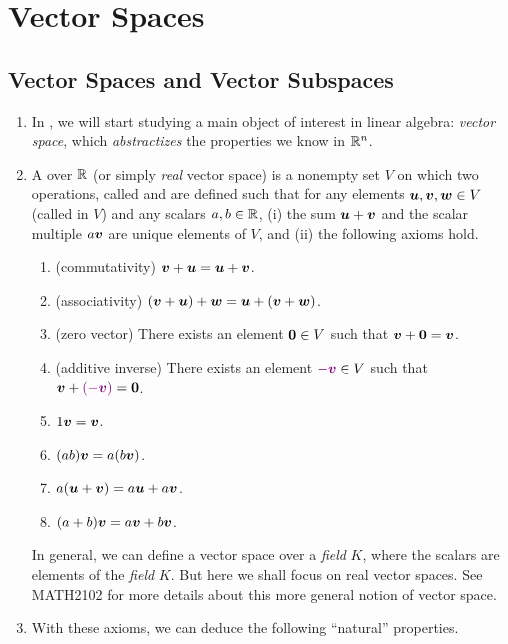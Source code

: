 \section{Vector Spaces}
\label{sect:vector-spaces}
\subsection{Vector Spaces and Vector Subspaces}
\begin{enumerate}
\item In , we will start studying a main object of
interest in linear algebra: \emph{vector space}, which \emph{abstractizes} the
properties we know in \(\mathbb{R}^n\).
\item A  over \(\mathbb{R}\) (or simply \emph{real} vector space) is
a nonempty set \(V\) on which two operations, called  and
 are defined such that for any elements
\(\vb*{u},\vb*{v},\vb*{w}\in V\) (called  in \(V\)) and any
scalars \(a,b\in\mathbb{R}\), (i) the sum \(\vb*{u}+\vb*{v}\) and the scalar multiple
\(a\vb*{v}\) are unique elements of \(V\), and (ii) the following axioms hold.
\begin{enumerate}[label={(\arabic*)}]
\item (commutativity) \(\vb*{v}+\vb*{u}=\vb*{u}+\vb*{v}\).
\item (associativity) \((\vb*{v}+\vb*{u})+\vb*{w}=\vb*{u}+(\vb*{v}+\vb*{w})\).
\item (zero vector) There exists an element \(\vb*{0}\in V\) such that \(\vb*{v}+\vb*{0}=\vb*{v}\).
\item (additive inverse) There exists an element \({\color{violet}-\vb*{v}}\in V\) such that
\(\vb*{v}+{\color{violet}(-\vb*{v})}=\vb*{0}\).
\item \(1\vb*{v}=\vb*{v}\).
\item \((ab)\vb*{v}=a(b\vb*{v})\).
\item \(a(\vb*{u}+\vb*{v})=a\vb*{u}+a\vb*{v}\).
\item \((a+b)\vb*{v}=a\vb*{v}+b\vb*{v}\).
\end{enumerate}
\begin{note}
In general, we can define a vector space over a \emph{field} \(K\), where the
scalars are elements of the \emph{field} \(K\). But here we shall focus on real
vector spaces. See MATH2102 for more details about this more general notion of
vector space.
\end{note}
\item With these axioms, we can deduce the following ``natural'' properties.

\end{enumerate}
